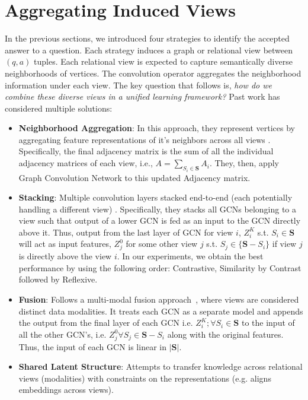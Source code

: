 \section{Aggregating Induced Views}
\label{sec:aggregation}
In the previous sections, we introduced four strategies to identify the accepted answer to a question. Each strategy induces a graph or relational view between $(q,a)$ tuples.
Each relational view is expected to capture semantically diverse neighborhoods of vertices. The convolution operator aggregates the neighborhood information under each view. The key question that follows is, \emph{how do we combine these diverse views in a unified learning framework?} Past work has considered multiple solutions:
\begin{itemize}
  \label{item:aggregator}
\item \textbf{Neighborhood Aggregation}: In this approach, they represent vertices by aggregating feature representations of it's neighbors across all views \cite{graphsage, relationalGCN}. Specifically, the final adjacency matrix is the sum of all the individual adjacency matrices of each view, i.e., $A = \sum_{S_i \in \mathbf{S}} A_i$. They, then, apply Graph Convolution Network to this updated Adjacency matrix.
\item \textbf{Stacking}: Multiple convolution layers stacked end-to-end (each potentially handling a different view) \cite{Stacking}. Specifically, they stacks all GCNs belonging to a view such that output of a lower GCN is fed as an input to the GCN directly above it. Thus, output from the last layer of GCN for view $i$, $Z_i^K$ s.t. $  S_i \in \textbf{S}$ will act as input features, $Z_j^0$ for some other view $j$ s.t. $S_j \in \{\textbf{S}-S_i \}$ if view $j$ is directly above the view $i$. In our experiments, we obtain the best performance by using the following order: Contrastive, Similarity by Contrast followed by Reflexive.
\item \textbf{Fusion}: Follows a multi-modal fusion approach~\cite{Fusion18}, where views are considered distinct data modalities. It treats each GCN as a separate model and appends the output from the final layer of each GCN i.e. $Z_i^K; \forall S_i \in \textbf{S}$ to the input of all the other GCN's, i.e. $Z_j^0 \forall S_j \in \textbf{S}-S_i$ along with the original features. Thus, the input of each GCN is linear in $\vert \textbf{S} \vert$.
\item \textbf{Shared Latent Structure}: Attempts to transfer knowledge across relational views (modalities) with constraints on the representations (e.g. \cite{DualGCN} aligns embeddings across views).
\end{itemize}

